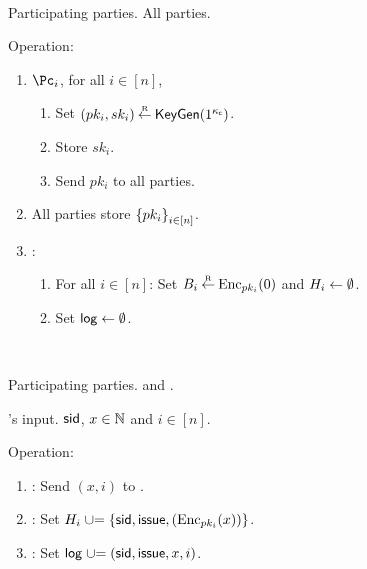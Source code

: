\begin{protocol}~\label{prot:ConfidentialTransactions:Init}
	\item[Participating parties.] All parties.
			
			\item Operation:
			
			
			\begin{enumerate}
				
				\item   $\Pc_i$, for  all $i\in [n]$,
				\begin{enumerate}
					\item Set $(pk_i,sk_i) \mathbin{\stackrel{\mbox{\tiny R}}{\leftarrow}} \mathsf{KeyGen}(1^{\kappa_{\mathsf c}})$.
					
					\item Store $sk_i$.
					
					\item Send $pk_i$ to all parties.
				\end{enumerate}
				
				\item All parties  store $\set{pk_i}_{i\in [n]}$.
				
				\item \Cc: 
				\begin{enumerate}
					\item 	For  all $i\in [n]$: Set $B_i\mathbin{\stackrel{\mbox{\tiny R}}{\leftarrow}} \operatorname{Enc}_{pk_i}(0)$ and $H_i\leftarrow \emptyset$.
					
					\item    Set $\mathsf{log} \leftarrow \emptyset$.
				\end{enumerate}								
			\end{enumerate}
\end{protocol}


\begin{protocol}~\label{prot:ConfidentialTransactions:Issue}
	\item[Participating parties.] \Ic and \Cc.
	
	
	\item[\Cc's input.] $\mathsf{sid}$, $x\in {\mathbb{N}}$ and $i\in [n]$.
	
	\item Operation:
	
	
	\begin{enumerate}
		
		\item   \Ic: Send $(x,i)$ to \Cc.
		
		\item \Cc:  Set $H_i \unioneq \set{\sid,\issue,(\Enc_{pk_i}(x))}$.
	
	 \item \Cc:  Set $\mathsf{log} \mathrel{\cup}= (\mathsf{sid},\mathsf{issue},x,i)$.
		
	\end{enumerate}
\end{protocol}


